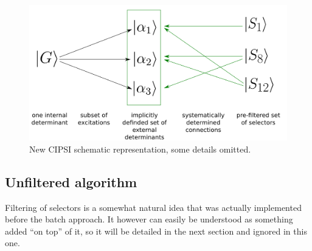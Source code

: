 \documentclass[./thesis.tex]{subfiles}
\begin{document}
\begin{figure}[h!]
        \begin{center}
                \includegraphics[width=0.8\columnwidth]{figures/cipsi/new_cipsi}
        \end{center}
        \caption{New CIPSI schematic representation, some details omitted.}
        \label{fig:new_cipsi}
\end{figure}

\subsection{Unfiltered algorithm}

Filtering of selectors is a somewhat natural idea that was actually implemented before the batch approach. It however can easily be understood as something added ``on top'' of it, so it will be detailed in the next section and ignored in this one.
\end{document}
